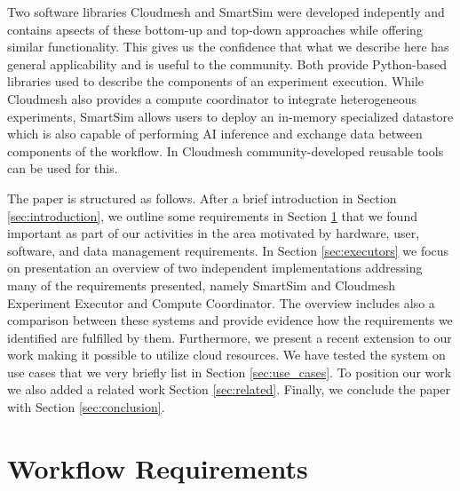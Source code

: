 \documentclass[sigconf]{acmart}
\begin{document}
Two software libraries Cloudmesh and SmartSim were developed indepently and contains apsects of these bottom-up and top-down approaches while offering similar functionality. This gives us the confidence that what we describe here has general applicability and is useful to the community. Both provide Python-based libraries used to describe the components of an experiment execution. While Cloudmesh also provides a compute coordinator to integrate heterogeneous experiments, SmartSim allows users to deploy an in-memory specialized datastore which is also capable of performing AI inference and exchange data between components of the workflow. In Cloudmesh \citep{cloudmesh-ee} community-developed reusable tools can be used for this.

The paper is structured as follows. After a brief introduction in Section \ref{sec:introduction}, we outline some requirements in Section \ref{sec:requirements} that we found important as part of our activities in the area motivated by hardware, user, software, and data management requirements. In  Section \ref{sec:executors} we focus on presentation an overview of two independent implementations addressing many of the requirements presented, namely SmartSim and Cloudmesh Experiment Executor and Compute Coordinator. The overview includes also a comparison between these systems and provide evidence how the requirements we identified are fulfilled by them. Furthermore, we present a recent extension to our work making it possible to utilize cloud resources.
We have tested the system on use cases that we very briefly list in Section \ref{sec:use_cases}.
To position our work we also added a related work Section \ref{sec:related}.
 Finally, we conclude the paper with Section \ref{sec:conclusion}.

\section{Workflow Requirements}
\label{sec:requirements}
\end{document}
